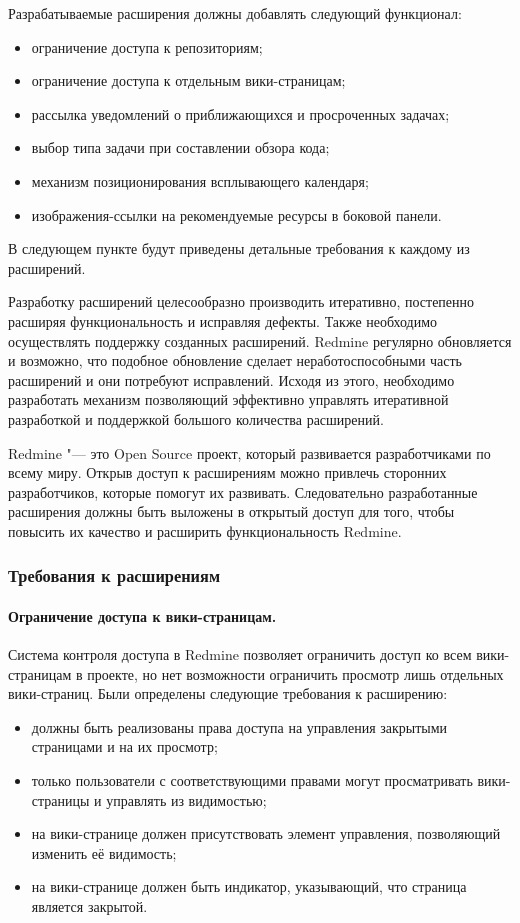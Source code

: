 Разрабатываемые расширения должны добавлять следующий функционал:
\begin{itemize}
  \item ограничение доступа к репозиториям;
  \item ограничение доступа к отдельным вики-страницам;
  \item рассылка уведомлений о приближающихся и просроченных задачах; 
  \item выбор типа задачи при составлении обзора кода;
  \item механизм позиционирования всплывающего календаря;
  \item изображения-ссылки на рекомендуемые ресурсы в боковой панели.
\end{itemize}
В следующем пункте будут приведены детальные требования к каждому из
расширений.

Разработку расширений целесообразно производить итеративно, постепенно расширяя
функциональность и исправляя дефекты. Также необходимо осуществлять поддержку
созданных расширений. Redmine регулярно обновляется и возможно, что подобное
обновление сделает неработоспособными часть расширений и они потребуют
исправлений. Исходя из этого, необходимо разработать механизм позволяющий
эффективно управлять итеративной разработкой и поддержкой большого количества
расширений.

Redmine "--- это Open Source проект, который развивается разработчиками по
всему миру. Открыв доступ к расширениям можно привлечь сторонних разработчиков,
которые помогут их развивать. Следовательно разработанные расширения должны
быть выложены в открытый доступ для того, чтобы повысить их качество и
расширить функциональность Redmine.

\subsubsection{Требования к расширениям}

\paragraph{Ограничение доступа к вики-страницам.}
\label{definition:private_wiki}
Система контроля доступа в Redmine позволяет ограничить доступ ко всем
вики-страницам в проекте, но нет возможности ограничить просмотр лишь
отдельных вики-страниц. Были определены следующие требования к расширению:
\begin{itemize}
  \item должны быть реализованы права доступа на управления закрытыми
  страницами и на их просмотр;
  \item только пользователи с соответствующими правами могут просматривать
  вики-страницы и управлять из видимостью;   
  \item на вики-странице должен присутствовать элемент управления, позволяющий
  изменить её видимость;
  \item на вики-странице должен быть индикатор, указывающий, что страница
  является закрытой.
\end{itemize}

